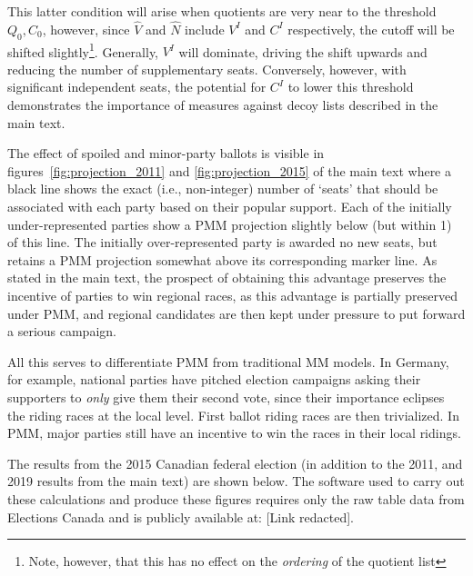 This latter condition will arise when quotients are very near to the threshold $Q_0,C_0$, however, since $\hat{V}$ and $\hat{N}$ include $V^I$ and $C^I$ respectively, the cutoff will be shifted slightly\footnote{Note, however, that this has no effect on the \emph{ordering} of the quotient list}.
Generally, $V^I$ will dominate, driving the shift upwards and reducing the number of supplementary seats.
Conversely, however, with significant independent seats, the potential for $C^I$ to lower this threshold demonstrates the importance of measures against decoy lists described in the main text.

The effect of spoiled and minor-party ballots is visible in figures~\ref{fig:projection_2011} and \ref{fig:projection_2015} of the main text where a black line shows the exact (i.e., non-integer) number of `seats' that should be associated with each party based on their popular support. 
Each of the initially under-represented parties show a PMM projection slightly below (but within 1) of this line. The initially over-represented party is awarded no new seats, but retains a PMM projection somewhat above its corresponding marker line.
As stated in the main text, the prospect of obtaining this advantage preserves the incentive of parties to win regional races, as this advantage is partially preserved under PMM, and regional candidates are then kept under pressure to put forward a serious campaign.

All this serves to differentiate PMM from traditional MM models. 
In Germany, for example, national parties have pitched election campaigns asking their supporters to \emph{only} give them their second vote, since their importance eclipses the riding races at the local level. First ballot riding races are then trivialized. 
In PMM, major parties still have an incentive to win the races in their local ridings.


The results from the 2015 Canadian federal election (in addition to the 2011, and 2019 results from the main text) are shown below. 
The software used to carry out these calculations and produce these figures requires only the raw table data from Elections Canada and is publicly available at:
[Link redacted].


